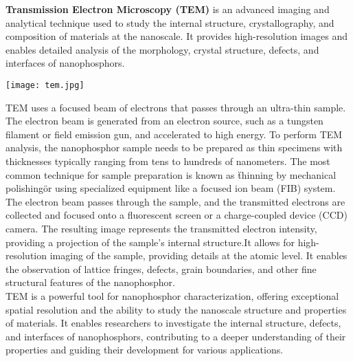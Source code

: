 \documentclass[../characterization.tex]{subfiles}
\begin{document}
    \textbf{Transmission Electron Microscopy (TEM)}\cite{b13} is an advanced imaging and analytical technique used to study 
    the internal structure, crystallography, and composition of materials at the nanoscale. It provides 
    high-resolution images and enables detailed analysis of the morphology, crystal structure, defects, and 
    interfaces of nanophosphors.
    \begin{Figure}
        \centering
        \texttt{[image: tem.jpg]}
        \label{fig:tem}
    \end{Figure}
    TEM uses a focused beam of electrons that passes through an ultra-thin sample. The electron beam is 
    generated from an electron source, such as a tungsten filament or field emission gun, and accelerated to 
    high energy. To perform TEM analysis, the nanophosphor sample needs to be prepared as thin specimens with 
    thicknesses typically ranging from tens to hundreds of nanometers. The most common technique for sample 
    preparation is known as \"thinning by mechanical polishing\" or using specialized equipment like a focused 
    ion beam (FIB) system. The electron beam passes through the sample, and the transmitted electrons are 
    collected and focused onto a fluorescent screen or a charge-coupled device (CCD) camera. The resulting 
    image represents the transmitted electron intensity, providing a projection of the sample's internal structure.It 
    allows for high-resolution imaging of the sample, providing details at the atomic level. It enables the 
    observation of lattice fringes, defects, grain boundaries, and other fine structural features of the 
    nanophosphor.
    \\
    TEM is a powerful tool for nanophosphor characterization, offering exceptional spatial resolution and the 
    ability to study the nanoscale structure and properties of materials. It enables researchers to investigate 
    the internal structure, defects, and interfaces of nanophosphors, contributing to a deeper understanding of 
    their properties and guiding their development for various applications.
\end{document}
